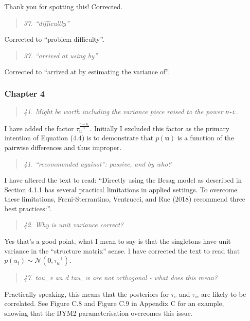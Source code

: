 \documentclass[
  12pt,
]{article}
\begin{document}
Thank you for spotting this! Corrected.

\begin{quote}
\emph{37. ``difficultly''}
\end{quote}

Corrected to ``problem difficulty''.

\begin{quote}
\emph{37. ``arrived at using by''}
\end{quote}

Corrected to ``arrived at by estimating the variance of''.

\subsubsection{Chapter 4}\label{chapter-4-1}

\begin{quote}
\emph{41. Might be worth including the variance piece raised to the
power \texttt{n-c}.}
\end{quote}

I have added the factor \(\tau_u^{\frac{n - n_c}{2}}\). Initially I
excluded this factor as the primary intention of Equation (4.4) is to
demonstrate that \(p(\mathbf{u})\) is a function of the pairwise
differences and thus improper.

\begin{quote}
\emph{41. ``recommended against'': passive, and by who?}
\end{quote}

I have altered the text to read: ``Directly using the Besag model as
described in Section 4.1.1 has several practical limitations in applied
settings. To overcome these limitations, Freni-Sterrantino, Ventrucci,
and Rue (2018) recommend three best practices:''.

\begin{quote}
\emph{42. Why is unit variance correct?}
\end{quote}

Yes that's a good point, what I mean to say is that the singletons have
unit variance in the ``structure matrix'' sense. I have corrected the
text to read that \(p(u_i) \sim \mathcal{N}(0, \tau_u^{-1})\).

\begin{quote}
\emph{47. tau\_v an d tau\_w are not orthogonal - what does this mean?}
\end{quote}

Practically speaking, this means that the posteriors for \(\tau_v\) and
\(\tau_w\) are likely to be correlated. See Figure C.8 and Figure C.9 in
Appendix C for an example, showing that the BYM2 parameterisation
overcomes this issue.
\end{document}
